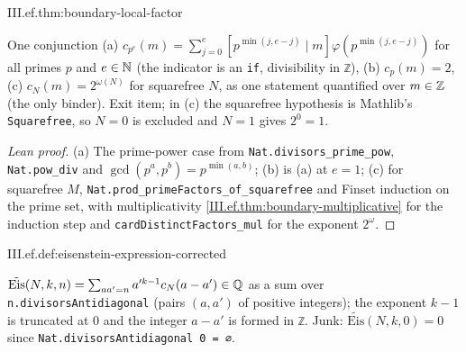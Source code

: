 \begin{theorem}
\end{theorem}
\begin{tfformal}{III.ef.thm:boundary-local-factor}
\begin{tffidelity}
One conjunction (a) $c_{p^e}(m)=\sum_{j=0}^{e}[p^{\min(j,e-j)}\mid m]\varphi(p^{\min(j,e-j)})$ for all primes $p$ and $e\in\mathbb{N}$ (the indicator is an \texttt{if}, divisibility in \texttt{ℤ}), (b) $c_p(m)=2$, (c) $c_N(m)=2^{\omega(N)}$ for squarefree $N$, as one statement quantified over $m\in\mathbb{Z}$ (the only binder). Exit item; in (c) the squarefree hypothesis is Mathlib's \texttt{Squarefree}, so $N=0$ is excluded and $N=1$ gives $2^0=1$.
\end{tffidelity}
\end{tfformal}
\begin{proof}[Lean proof]
(a) The prime-power case from \texttt{Nat.divisors\_prime\_pow}, \texttt{Nat.pow\_div} and $\gcd(p^a,p^b)=p^{\min(a,b)}$; (b) is (a) at $e=1$; (c) for squarefree $M$, \texttt{Nat.prod\_primeFactors\_of\_squarefree} and Finset induction on the prime set, with multiplicativity \cref{III.ef.thm:boundary-multiplicative} for the induction step and \texttt{cardDistinctFactors\_mul} for the exponent $2^{\omega}$.
\end{proof}

\begin{definition}
\end{definition}
\begin{tfformal}{III.ef.def:eisenstein-expression-corrected}
\begin{tffidelity}
$\tilde{\mathrm{Eis}}(N,k,n)=\sum_{aa'=n}a'^{k-1}c_N(a-a')\in\mathbb{Q}$ as a sum over \texttt{n.divisorsAntidiagonal} (pairs $(a,a')$ of positive integers); the exponent $k-1$ is truncated at $0$ and the integer $a-a'$ is formed in \texttt{ℤ}. Junk: $\tilde{\mathrm{Eis}}(N,k,0)=0$ since \texttt{Nat.divisorsAntidiagonal 0 = ∅}.
\end{tffidelity}
\end{tfformal}

